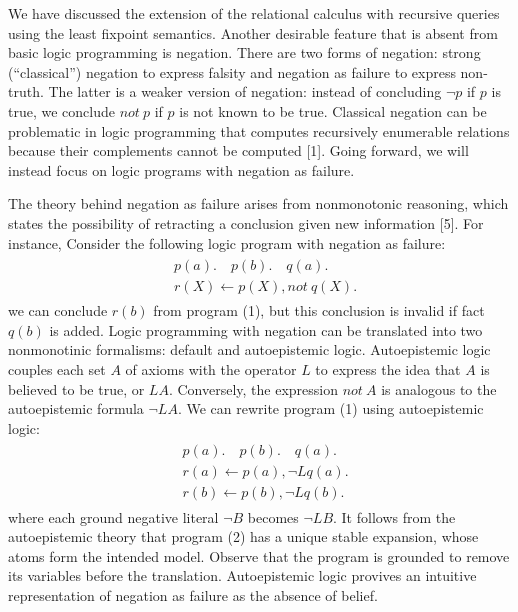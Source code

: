 We have discussed the extension of the relational calculus with recursive queries 
using the least fixpoint semantics. Another desirable feature that is absent from 
basic logic programming is negation. There are two forms of negation: strong (``classical'') 
negation to express falsity and negation as failure to express non-truth. The 
latter is a weaker version of negation: instead of concluding 
$\neg p$ if $p$ is true, we conclude $not \: p$ if $p$ is not known to be true. 
Classical negation can be problematic in logic programming that computes 
recursively enumerable relations because their complements cannot be computed [1]. 
Going forward, we will instead focus on logic programs with negation as failure. 

The theory behind negation as failure arises from nonmonotonic reasoning, which states 
the possibility of retracting a conclusion given new information [5]. For instance, 
Consider the following logic program with negation as failure:
\begin{align}
    \begin{split}
        & p(a). \hspace{1em} p(b). \hspace{1em} q(a). \\
        & r(X) \leftarrow p(X), not \: q(X).
    \end{split}
\end{align}
we can conclude $r(b)$ from 
program (1), but this conclusion is invalid if fact $q(b)$ is added. Logic programming with 
negation can be translated into two nonmonotinic formalisms: default and autoepistemic logic. 
Autoepistemic logic couples each set $A$ of axioms with the operator $L$ to express the idea that 
$A$ is believed to be true, or $LA$. Conversely, the expression $not \: A$ is analogous to the autoepistemic formula 
$\neg LA$. We can rewrite program (1) using autoepistemic logic:
\begin{align}
    \begin{split}
        & p(a). \hspace{1em} p(b). \hspace{1em} q(a). \\
        & r(a) \leftarrow p(a), \neg Lq(a). \\ 
        & r(b) \leftarrow p(b), \neg Lq(b).
    \end{split}
\end{align}
where each ground negative literal $\neg B$ becomes $\neg LB$. It follows from the 
autoepistemic theory that program (2) has a unique stable expansion, whose atoms 
form the intended model. Observe that the program is 
grounded to remove its variables before the translation. Autoepistemic logic provives an intuitive 
representation of negation as failure as the absence of belief. 

